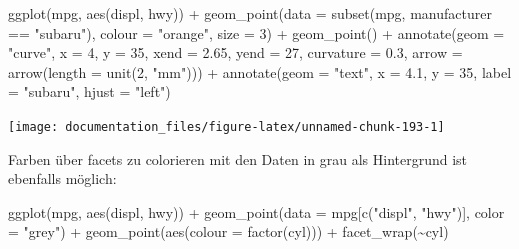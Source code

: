 \documentclass[
]{article}
\newenvironment{Shaded}{\begin{snugshade}}{\end{snugshade}}
\newcommand{\AttributeTok}[1]{\textcolor[rgb]{0.77,0.63,0.00}{#1}}
\newcommand{\DecValTok}[1]{\textcolor[rgb]{0.00,0.00,0.81}{#1}}
\newcommand{\FloatTok}[1]{\textcolor[rgb]{0.00,0.00,0.81}{#1}}
\newcommand{\FunctionTok}[1]{\textcolor[rgb]{0.00,0.00,0.00}{#1}}
\newcommand{\NormalTok}[1]{#1}
\newcommand{\SpecialCharTok}[1]{\textcolor[rgb]{0.00,0.00,0.00}{#1}}
\newcommand{\StringTok}[1]{\textcolor[rgb]{0.31,0.60,0.02}{#1}}
\begin{document}
\begin{Shaded}
\begin{Highlighting}[]
\FunctionTok{ggplot}\NormalTok{(mpg, }\FunctionTok{aes}\NormalTok{(displ, hwy)) }\SpecialCharTok{+}
  \FunctionTok{geom\_point}\NormalTok{(}\AttributeTok{data =} \FunctionTok{subset}\NormalTok{(mpg, manufacturer }\SpecialCharTok{==} \StringTok{"subaru"}\NormalTok{), }
             \AttributeTok{colour =} \StringTok{"orange"}\NormalTok{,}
             \AttributeTok{size =} \DecValTok{3}\NormalTok{) }\SpecialCharTok{+}
  \FunctionTok{geom\_point}\NormalTok{() }\SpecialCharTok{+} 
  \FunctionTok{annotate}\NormalTok{(}\AttributeTok{geom =} \StringTok{"curve"}\NormalTok{, }
           \AttributeTok{x =} \DecValTok{4}\NormalTok{, }\AttributeTok{y =} \DecValTok{35}\NormalTok{, }\AttributeTok{xend =} \FloatTok{2.65}\NormalTok{, }\AttributeTok{yend =} \DecValTok{27}\NormalTok{, }
           \AttributeTok{curvature =} \FloatTok{0.3}\NormalTok{, }\AttributeTok{arrow =} \FunctionTok{arrow}\NormalTok{(}\AttributeTok{length =} \FunctionTok{unit}\NormalTok{(}\DecValTok{2}\NormalTok{, }\StringTok{"mm"}\NormalTok{))) }\SpecialCharTok{+}
  \FunctionTok{annotate}\NormalTok{(}\AttributeTok{geom =} \StringTok{"text"}\NormalTok{, }\AttributeTok{x =} \FloatTok{4.1}\NormalTok{, }\AttributeTok{y =} \DecValTok{35}\NormalTok{, }\AttributeTok{label =} \StringTok{"subaru"}\NormalTok{, }\AttributeTok{hjust =} \StringTok{"left"}\NormalTok{)}
\end{Highlighting}
\end{Shaded}

\begin{center}\texttt{[image: documentation\_files/figure-latex/unnamed-chunk-193-1]} \end{center}

Farben über facets zu colorieren mit den Daten in grau als Hintergrund ist ebenfalls möglich:

\begin{Shaded}
\begin{Highlighting}[]
\FunctionTok{ggplot}\NormalTok{(mpg, }\FunctionTok{aes}\NormalTok{(displ, hwy)) }\SpecialCharTok{+}
  \FunctionTok{geom\_point}\NormalTok{(}\AttributeTok{data =}\NormalTok{ mpg[}\FunctionTok{c}\NormalTok{(}\StringTok{"displ"}\NormalTok{, }\StringTok{"hwy"}\NormalTok{)], }\AttributeTok{color =} \StringTok{"grey"}\NormalTok{) }\SpecialCharTok{+}
  \FunctionTok{geom\_point}\NormalTok{(}\FunctionTok{aes}\NormalTok{(}\AttributeTok{colour =} \FunctionTok{factor}\NormalTok{(cyl))) }\SpecialCharTok{+}
  \FunctionTok{facet\_wrap}\NormalTok{(}\SpecialCharTok{\textasciitilde{}}\NormalTok{cyl)}
\end{Highlighting}
\end{Shaded}
\end{document}
